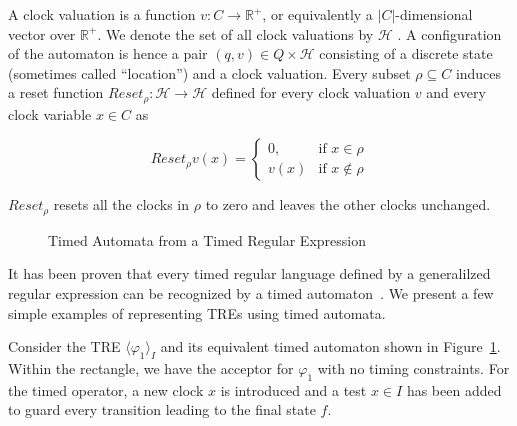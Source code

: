 \documentclass[]{sigplanconf}
\begin{document}
A clock valuation is a function $v \colon C \rightarrow \mathbb{R}^+$, or equivalently a $|C|$-dimensional vector over $\mathbb{R}^+$. We denote the set of all clock valuations by $\mathcal{H}$ . A configuration of the automaton is hence a pair $(q,v) \in Q \times \mathcal{H}$ consisting of a discrete state (sometimes called “location”) and a clock valuation. Every subset $\rho \subseteq C$ induces a reset function $Reset_\rho : \mathcal{H} \rightarrow \mathcal{H}$ defined for every clock valuation $v$ and every clock variable $x \in C$ as

\begin{equation}\label{timed_automaton}
Reset_\rho v(x) = \begin{cases}
0, & \text{if $x \in \rho$} \\
v(x) &\text{if $x \notin \rho$}
\end{cases}
\end{equation}

$Reset_\rho$ resets all the clocks in $\rho$ to zero and leaves the other clocks unchanged.

\begin{figure}
\caption{Timed Automata from a Timed Regular Expression}
\label{fig:tretoautomata}
\end{figure}


It has been proven that every timed regular language  defined by a generalilzed regular expression can be recognized by a timed automaton~\cite{timedregex}. We present a few simple examples of representing TREs using timed automata.

Consider the TRE $\langle \varphi_1  \rangle_I$ and its equivalent timed automaton shown in Figure~\ref{fig:tretoautomata}. Within the rectangle, we have the acceptor for $\varphi_1$ with no timing constraints. For the timed operator, a new clock $x$ is introduced and a test $x \in I$ has been added to guard every transition leading to the final state $f$.
\end{document}
